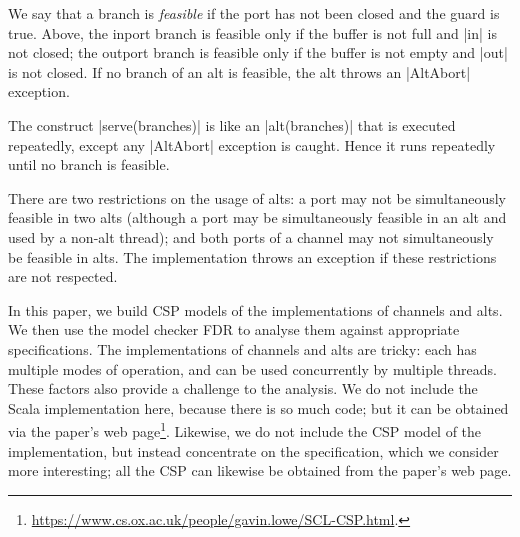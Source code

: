 We say that a branch is \emph{feasible} if the port has not been closed and
the guard is true.  Above, the inport branch is feasible only if the buffer is
not full and |in| is not closed; the outport branch is feasible only if the
buffer is not empty and |out| is not closed.  If no branch of an alt is
feasible, the alt throws an |AltAbort| exception.

The construct |serve(branches)| is like an |alt(branches)| that is executed
repeatedly, except any |AltAbort| exception is caught.  Hence it runs
repeatedly until no branch is feasible. 

There are two restrictions on the usage of alts: a port may not be
simultaneously feasible in two alts (although a port may be simultaneously
feasible in an alt and used by a non-alt thread); and both ports of a channel
may not simultaneously be feasible in alts.  The implementation throws an
exception if these restrictions are not respected.

In this paper, we build CSP models of the implementations of channels and
alts.  We then use the model checker FDR to analyse them against appropriate
specifications. 
%
The implementations of channels and alts are tricky: each has multiple modes
of operation, and can be used concurrently by multiple threads.  These factors
also provide a challenge to the analysis.
%
We do not include the Scala implementation here, because there is so much
code; but it can be obtained via the paper's web
page\footnote{\url{https://www.cs.ox.ac.uk/people/gavin.lowe/SCL-CSP.html}.}. 
Likewise, we do not include the CSP model of the implementation, but instead
concentrate on the specification, which we consider more interesting; all the
CSP can likewise be obtained from the paper's web page.

